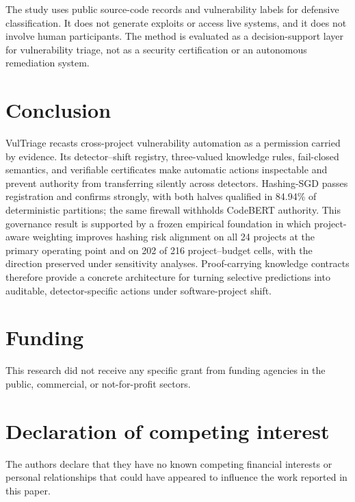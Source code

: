 \documentclass[preprint,12pt]{elsarticle}
\newcommand{\method}{VulTriage\xspace}
\begin{document}
The study uses public source-code records and vulnerability labels for defensive classification. It does not generate exploits or access live systems, and it does not involve human participants. The method is evaluated as a decision-support layer for vulnerability triage, not as a security certification or an autonomous remediation system.

\section{Conclusion}

\method recasts cross-project vulnerability automation as a permission carried by evidence. Its detector--shift registry, three-valued knowledge rules, fail-closed semantics, and verifiable certificates make automatic actions inspectable and prevent authority from transferring silently across detectors. Hashing-SGD passes registration and confirms strongly, with both halves qualified in 84.94\% of deterministic partitions; the same firewall withholds CodeBERT authority. This governance result is supported by a frozen empirical foundation in which project-aware weighting improves hashing risk alignment on all 24 projects at the primary operating point and on 202 of 216 project--budget cells, with the direction preserved under sensitivity analyses. Proof-carrying knowledge contracts therefore provide a concrete architecture for turning selective predictions into auditable, detector-specific actions under software-project shift.

\section*{Funding}
This research did not receive any specific grant from funding agencies in the public, commercial, or not-for-profit sectors.

\section*{Declaration of competing interest}
The authors declare that they have no known competing financial interests or personal relationships that could have appeared to influence the work reported in this paper.
\end{document}
